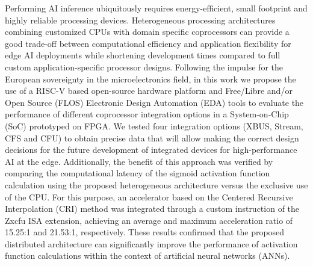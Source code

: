 \documentclass[
11pt, %
spanish, %
singlespacing, %
headsepline, %
]{MastersDoctoralThesis} %
\begin{document}
\begin{Abstract}
\addchaptertocentry{\resumennamein} %
Performing AI inference ubiquitously requires energy-efficient, small footprint and highly reliable processing devices. 
Heterogeneous processing architectures combining customized CPUs with domain specific coprocessors can provide a good trade-off between computational efficiency and application flexibility for edge AI deployments while shortening development times compared to full custom application-specific processor designs. 
Following the impulse for the European sovereignty in the microelectronics field, in this work we propose the use of a RISC-V based open-source hardware platform and Free/Libre and/or Open Source (FLOS) Electronic Design Automation (EDA) tools to evaluate the performance of different coprocessor integration options in a System-on-Chip (SoC) prototyped on FPGA. 
We tested four integration options (XBUS, Stream, CFS and CFU) to obtain precise data that will allow making the correct design decisions for the future development of integrated devices for high-performance AI at the edge.
Additionally, the benefit of this approach was verified by comparing the computational latency of the sigmoid activation function calculation using the proposed heterogeneous architecture versus the exclusive use of the CPU.
For this purpose, an accelerator based on the Centered Recursive Interpolation (CRI) method was integrated through a custom instruction of the Zxcfu ISA extension, achieving an average and maximum acceleration ratio of 15.25:1 and 21.53:1, respectively.
These results confirmed that the proposed distributed architecture can significantly improve the performance of activation function calculations within the context of artificial neural networks (ANNs).
\vspace{2cm}
\end{Abstract}


\tableofcontents %
\addchaptertocentry{\contentsname}  %
\listoffigures %
\addchaptertocentry{\listfigurename} %
\listoftables %
\addchaptertocentry{\listtablename} %
\end{document}
